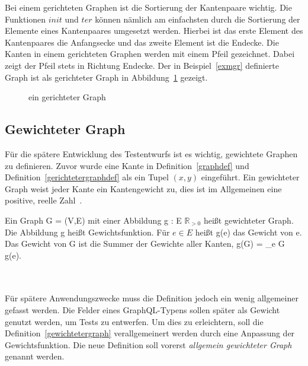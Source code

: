 Bei einem gerichteten Graphen ist die Sortierung der Kantenpaare wichtig.
Die Funktionen $init$ und $ter$ können nämlich am einfachsten durch die Sortierung der Elemente eines Kantenpaares umgesetzt werden.
Hierbei ist das erste Element des Kantenpaares die Anfangsecke und das zweite Element ist die Endecke.
Die Kanten in einem gerichteten Graphen werden mit einem Pfeil gezeichnet.
Dabei zeigt der Pfeil stets in Richtung Endecke.
Der in Beispiel~\ref{exmgr} definierte Graph ist als gerichteter Graph in Abbildung~\ref{graphexample} gezeigt.

\begin{figure}[H]
    \begin{center}
    \end{center}
    \caption{ein gerichteter Graph}
    \label{graphexample}
\end{figure}

\subsection{Gewichteter Graph}

Für die spätere Entwicklung des Testentwurfs ist es wichtig, gewichtete Graphen zu definieren.
Zuvor wurde eine Kante in Definition~\ref{graphdef} und Definition~\ref{gerichtetergraphdef} als ein Tupel $(x, y)$ eingeführt.
Ein gewichteter Graph weist jeder Kante ein Kantengewicht zu, dies ist im Allgemeinen eine positive, reelle Zahl~\cite[vgl. S. 251]{graphentheorie3}.

\begin{definition}
    Ein Graph G = (V,E) mit einer Abbildung g : E \textrightarrow $\mathbb{R}_{>0}$ heißt gewichteter Graph.
    Die Abbildung g heißt Gewichtsfunktion. Für $e \in E$ heißt g(e) das Gewicht von e.
    Das Gewicht von G ist die Summer der Gewichte aller Kanten, g(G) = \sum_{e \in G} g(e).\\
    \cite[vgl.~Definition~6.1~S.~251]{graphentheorie3}
    \label{gewichtetergraph}
\end{definition}
\\
\\
Für spätere Anwendungszwecke muss die Definition jedoch ein wenig allgemeiner gefasst werden.
Die Felder eines GraphQL-Typens sollen später als Gewicht genutzt werden, um Tests zu entwerfen.
Um dies zu erleichtern, soll die Definition~\ref{gewichtetergraph} verallgemeinert werden durch eine Anpassung der Gewichtsfunktion.
Die neue Definition soll vorerst \textit{allgemein gewichteter Graph} genannt werden.

